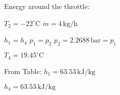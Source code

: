 Energy around the throttle:  

\( T_2 = -22^\circ \text{C} \)  
\( \dot{m} = 4 \, \text{kg/h} \)  

\( h_1 = h_4 \)  
\( p_1 = p_2 \)  
\( p_2 = 2.2688 \, \text{bar} = p_1 \)  

\( T_4 = 19.45^\circ \text{C} \)  

From Table:  
\( h_1 = 63.53 \, \text{kJ/kg} \)  

\( h_4 = 63.53 \, \text{kJ/kg} \)